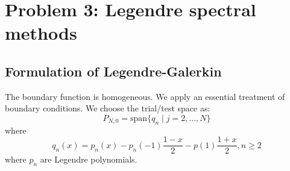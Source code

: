 \documentclass[12pt, fullpage,letterpaper]{article}
\begin{document}
\section{Problem 3: Legendre spectral methods}
\subsection{Formulation of Legendre-Galerkin}
The boundary function is homogeneous. We apply an essential treatment of boundary conditions. 
We choose the trial/test space as:
\begin{equation}
    P_{N,0} = \text{span}\{ q_n \mid j =2, \dots , N\}
\end{equation}
where
\begin{equation}
    q_n(x) = p_n(x) - p_n(-1)\frac{1-x}{2} - p(1)\frac{1+x}{2}, n \geq 2
\end{equation}
where $p_n$ are Legendre polynomials.


\end{document}
